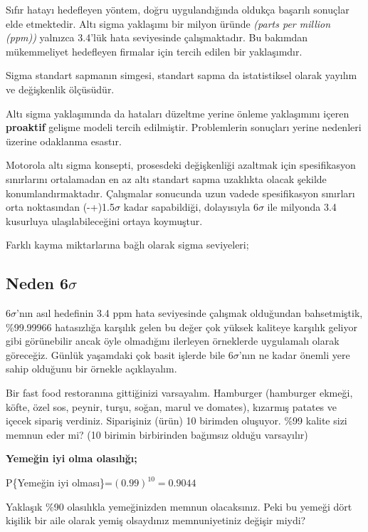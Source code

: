 \documentclass[
]{book}
\begin{document}
Sıfır hatayı hedefleyen yöntem, doğru uygulandığında oldukça başarılı sonuçlar elde etmektedir. Altı sigma yaklaşımı bir milyon üründe \emph{(parts per million (ppm))} yalnızca 3.4'lük hata seviyesinde çalışmaktadır. Bu bakımdan mükemmeliyet hedefleyen firmalar için tercih edilen bir yaklaşımdır.

Sigma standart sapmanın simgesi, standart sapma da istatistiksel olarak yayılım ve değişkenlik ölçüsüdür.

Altı sigma yaklaşımında da hataları düzeltme yerine önleme yaklaşımını içeren \textbf{proaktif} gelişme modeli tercih edilmiştir. Problemlerin sonuçları yerine nedenleri üzerine odaklanma esastır.

Motorola altı sigma konsepti, prosesdeki değişkenliği azaltmak için spesifikasyon sınırlarını ortalamadan en az altı standart sapma uzaklıkta olacak şekilde konumlandırmaktadır. Çalışmalar sonucunda uzun vadede spesifikasyon sınırları orta noktasından (-+)1.5\(\sigma\) kadar sapabildiği, dolayısıyla 6\(\sigma\) ile milyonda 3.4 kusurluya ulaşılabileceğini ortaya koymuştur.

Farklı kayma miktarlarına bağlı olarak sigma seviyeleri;

\hypertarget{neden-6sigma}{%
\subsection{\texorpdfstring{Neden 6\(\sigma\)}{Neden 6\textbackslash sigma}}\label{neden-6sigma}}

6\(\sigma\)'nın asıl hedefinin 3.4 ppm hata seviyesinde çalışmak olduğundan bahsetmiştik, \%99.99966 hatasızlığa karşılık gelen bu değer çok yüksek kaliteye karşılık geliyor gibi görünebilir ancak öyle olmadığını ilerleyen örneklerde uygulamalı olarak göreceğiz. Günlük yaşamdaki çok basit işlerde bile 6\(\sigma\)'nın ne kadar önemli yere sahip olduğunu bir örnekle açıklayalım.

Bir fast food restoranına gittiğinizi varsayalım. Hamburger (hamburger ekmeği, köfte, özel sos, peynir, turşu, soğan, marul ve domates), kızarmış patates ve içecek sipariş verdiniz. Siparişiniz (ürün) 10 birimden oluşuyor. \%99 kalite sizi memnun eder mi? (10 birimin birbirinden bağımsız olduğu varsayılır)

\textbf{Yemeğin iyi olma olasılığı;}

P\{Yemeğin iyi olması\}=\((0.99)^{10}=0.9044\)

Yaklaşık \%90 olasılıkla yemeğinizden memnun olacaksınız. Peki bu yemeği dört kişilik bir aile olarak yemiş olsaydınız memnuniyetiniz değişir miydi?
\end{document}
